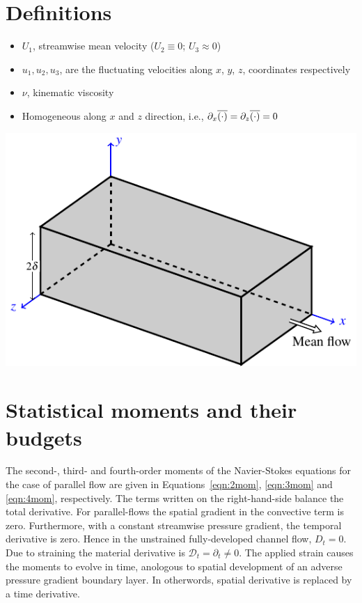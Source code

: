 \documentclass[letter,10pt,notitlepage]{article}
\newcommand*{\oline}[1]{\overline{#1\mathstrut}}
\begin{document}
\section*{Definitions}
\begin{minipage}[t!]{80mm}
\begin{itemize}
\item $U_1$, streamwise mean velocity ($U_2\equiv 0$; $U_3\approx 0$)
\item $u_1,u_2,u_3$, are the fluctuating velocities along $x$, $y$, $z$, coordinates respectively
\item $\nu$, kinematic viscosity
\item Homogeneous along $x$ and $z$ direction, i.e., $\partial_x \oline{(\cdot)}=\partial_z \oline{(\cdot)}=0$
\end{itemize}
\end{minipage}
\hfill
\begin{minipage}[t!]{90mm}
\includegraphics[angle=0.0,width=\textwidth]{channelFig.pdf}
\end{minipage}

\section*{Statistical moments and their budgets}
The second-, third- and fourth-order moments of the Navier-Stokes equations for the case of parallel flow
are given in Equations~\eqref{eqn:2mom}, \eqref{eqn:3mom} and \eqref{eqn:4mom}, respectively.  The terms written on the right-hand-side 
balance the total derivative.  For parallel-flows the spatial gradient in the convective term is zero.  
Furthermore, with a constant streamwise pressure gradient, the temporal derivative is zero.  
Hence in the unstrained fully-developed channel flow, $D_t=0$.  Due to straining the material derivative is $\mathcal{D}_t=\partial_t \neq 0$.  The applied strain causes the moments to evolve in time, anologous to spatial development of an adverse pressure gradient boundary layer.  In otherwords, spatial derivative is replaced by a time derivative.
\end{document}
